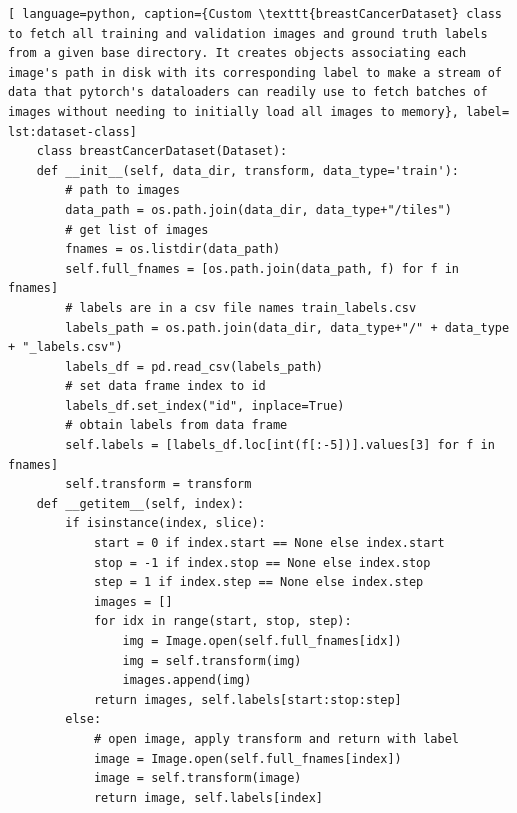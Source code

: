 \documentclass{l4proj}
\begin{document}
\begin{appendices}
\begin{lstlisting}[ language=python, caption={Custom \texttt{breastCancerDataset} class to fetch all training and validation images and ground truth labels from a given base directory. It creates objects associating each image's path in disk with its corresponding label to make a stream of data that pytorch's dataloaders can readily use to fetch batches of images without needing to initially load all images to memory}, label= lst:dataset-class]
    class breastCancerDataset(Dataset):
    def __init__(self, data_dir, transform, data_type='train'):
        # path to images
        data_path = os.path.join(data_dir, data_type+"/tiles")
        # get list of images
        fnames = os.listdir(data_path)
        self.full_fnames = [os.path.join(data_path, f) for f in fnames]
        # labels are in a csv file names train_labels.csv
        labels_path = os.path.join(data_dir, data_type+"/" + data_type + "_labels.csv")
        labels_df = pd.read_csv(labels_path)
        # set data frame index to id
        labels_df.set_index("id", inplace=True)
        # obtain labels from data frame
        self.labels = [labels_df.loc[int(f[:-5])].values[3] for f in fnames]
        self.transform = transform
    def __getitem__(self, index):
        if isinstance(index, slice):
            start = 0 if index.start == None else index.start
            stop = -1 if index.stop == None else index.stop
            step = 1 if index.step == None else index.step
            images = []
            for idx in range(start, stop, step):
                img = Image.open(self.full_fnames[idx])
                img = self.transform(img)
                images.append(img)
            return images, self.labels[start:stop:step]
        else:
            # open image, apply transform and return with label
            image = Image.open(self.full_fnames[index])
            image = self.transform(image)
            return image, self.labels[index]
\end{lstlisting}





\end{appendices}







\end{document}
